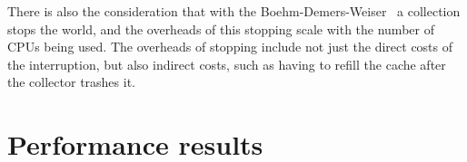 There is also the consideration that with the
Boehm-Demers-Weiser~\citep{boehm:1988:gc}
a collection stops the world,
and the overheads of this stopping scale with the number of CPUs being used.
The overheads of stopping include
not just the direct costs of the interruption,
but also indirect costs,
such as having to refill the cache after the collector trashes it.

\section{Performance results}
\label{sec:overlap_perf}




